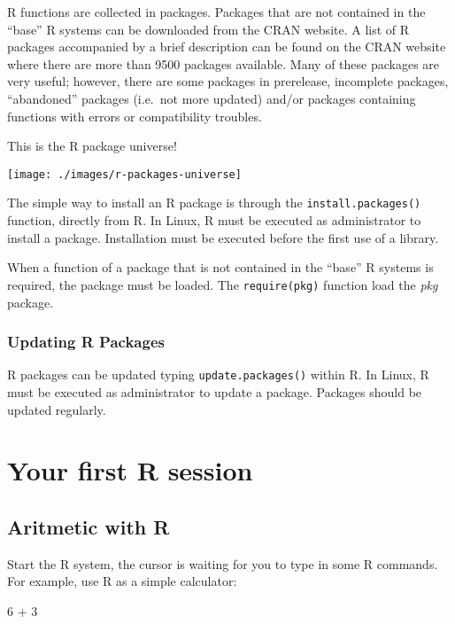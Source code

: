 \documentclass[]{book}
\newenvironment{Shaded}{\begin{snugshade}}{\end{snugshade}}
\newcommand{\DecValTok}[1]{\textcolor[rgb]{0.00,0.00,0.81}{{#1}}}
\newcommand{\StringTok}[1]{\textcolor[rgb]{0.31,0.60,0.02}{{#1}}}
\newcommand{\NormalTok}[1]{{#1}}
\begin{document}
R functions are collected in packages. Packages that are not contained
in the ``base'' R systems can be downloaded from the CRAN website. A
list of R packages accompanied by a brief description can be found on
the CRAN website where there are more than 9500 packages available. Many
of these packages are very useful; however, there are some packages in
prerelease, incomplete packages, ``abandoned'' packages (i.e.~not more
updated) and/or packages containing functions with errors or
compatibility troubles.

This is the R package universe!

\texttt{[image: ./images/r-packages-universe]}

The simple way to install an R package is through the
\texttt{install.packages()} function, directly from R. In Linux, R must
be executed as administrator to install a package. Installation must be
executed before the first use of a library.

When a function of a package that is not contained in the ``base'' R
systems is required, the package must be loaded. The
\texttt{require(pkg)} function load the \emph{pkg} package.

\subsection{Updating R Packages}\label{updating-r-packages}

R packages can be updated typing \texttt{update.packages()} within R. In
Linux, R must be executed as administrator to update a package. Packages
should be updated regularly.

\chapter{Your first R session}\label{your-first-r-session}

\section{Aritmetic with R}\label{aritmetic-with-r}

Start the R system, the cursor is waiting for you to type in some R
commands. For example, use R as a simple calculator:

\begin{Shaded}
\begin{Highlighting}[]
\DecValTok{6} \NormalTok{+}\StringTok{ }\DecValTok{3}
\end{Highlighting}
\end{Shaded}
\end{document}
